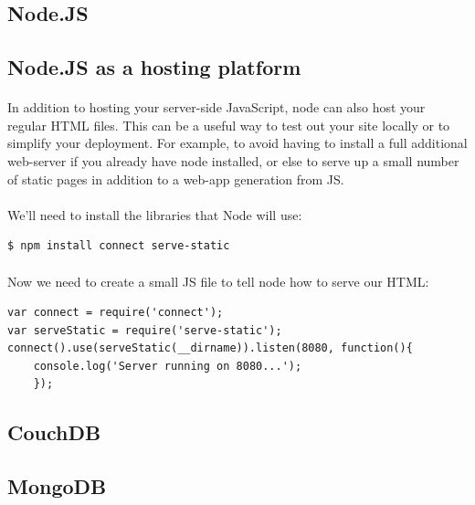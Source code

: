 \documentclass[10pt, a4paper, twosize]{article}
\begin{document}
\subsection{Node.JS}
\paragraph{}

\subsection{Node.JS as a hosting platform}
\paragraph{} In addition to hosting your server-side JavaScript, node can also host your regular HTML files. This can be a useful way to test out your site locally or to simplify your deployment. For example, to avoid having to install a full additional web-server if you already have node installed, or else to serve up a small number of static pages in addition to a web-app generation from JS. 

\paragraph{} We'll need to install the libraries that Node will use:


\begin{lstlisting}[style=DOS]
$ npm install connect serve-static
\end{lstlisting}

\paragraph{} Now we need to create a small JS file to tell node how to serve our HTML:

\begin{lstlisting}
var connect = require('connect');
var serveStatic = require('serve-static');
connect().use(serveStatic(__dirname)).listen(8080, function(){ 
    console.log('Server running on 8080...');
    });
\end{lstlisting}


\subsection{CouchDB}
\paragraph{}

\subsection{MongoDB}
\paragraph{}
\end{document}
